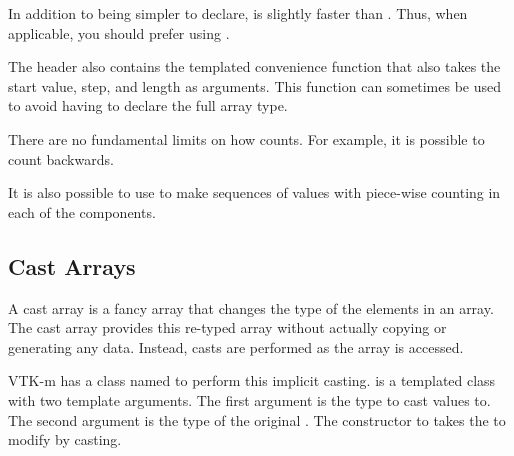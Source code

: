 
\begin{didyouknow}
  In addition to being simpler to declare,
   is slightly faster than
  . Thus, when applicable, you should
  prefer using .
\end{didyouknow}

The  header also contains the
templated convenience function  that
also takes the start value, step, and length as arguments. This function
can sometimes be used to avoid having to declare the full array type.


There are no fundamental limits on how 
counts. For example, it is possible to count backwards.


It is also possible to use  to make
sequences of  values with piece-wise counting in each of the
components.



\subsection{Cast Arrays}
\label{sec:CastArrays}


A cast array is a fancy array that changes the type of the elements in an
array. The cast array provides this re-typed array without actually copying
or generating any data. Instead, casts are performed as the array is
accessed.

VTK-m has a class named  to perform this implicit
casting.  is a templated class with two
template arguments. The first argument is the type to cast values to. The
second argument is the type of the original .
The constructor to  takes the
 to modify by casting.

